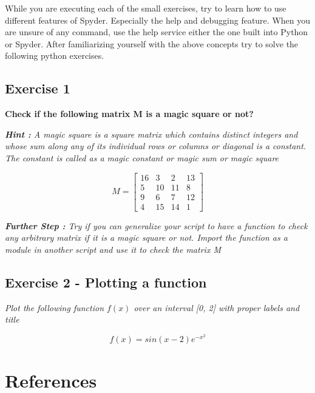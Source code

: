 \documentclass{cmc}
\begin{document}
While you are executing each of the small exercises, try to learn how to use different features of Spyder. Especially the help and debugging feature.
When you are unsure of any command, use the help service either the one built into Python or Spyder.
After familiarizing yourself with the above concepts try to solve the following python exercises.

\subsection{Exercise 1}
\textbf{Check if the following matrix M is a magic square or not?}

\textit{\textbf{Hint : } A magic square is a square matrix which contains distinct integers and whose sum along any of its individual rows or columns or diagonal is a constant.
The constant is called as a magic constant or magic sum or magic square}

\begin{equation*}
  \label{eq:1}
  M = 
  \begin{bmatrix}
    16 & 3  & 2  & 13 \\
    5  & 10 & 11 & 8  \\
    9  & 6  & 7  & 12 \\
    4 & 15 & 14 & 1
  \end{bmatrix}
\end{equation*}

\textit{\textbf{Further Step : } Try if you can generalize your script to have a
  function to check any arbitrary matrix if it is a magic square or not.  Import
  the function as a module in another script and use it to check the matrix M}

\subsection{Exercise 2 - Plotting a function}

\textit{Plot the following function $f(x)$ over an interval [0, 2] with proper
  labels and title}

\begin{equation*}
  \label{eq:3}
  f(x) = sin(x - 2)e^{-x^2}
\end{equation*}

\newpage
\section{References}
\label{sec:references}
\end{document}

